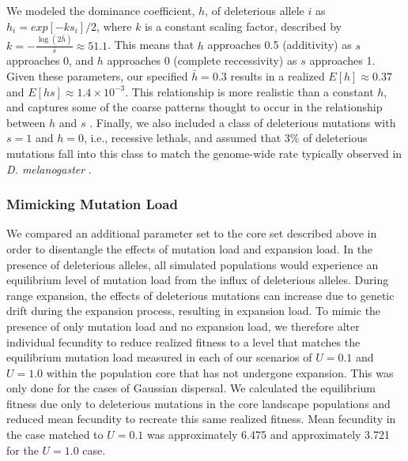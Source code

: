 We modeled the dominance coefficient, $h$, of deleterious allele $i$ as $h_i = exp[-k s_i]/2$, where $k$ is a constant scaling factor, described by $k = -\frac{\log{(2 \bar{h})}}{\bar{s}} \approx 51.1$. This means that $h$ approaches 0.5 (additivity) as $s$ approaches 0, and $h$ approaches 0 (complete reccessivity) as $s$ approaches 1. Given these parameters, our specified $\bar{h} = 0.3$ results in a realized $E[h] \approx 0.37$ and $E[hs] \approx 1.4\times10^{-3}$. This relationship is more realistic than a constant $h$, and captures some of the coarse patterns thought to occur in the relationship between $h$ and $s$ \citep{Agrawal:2011}. Finally, we also included a class of deleterious mutations with $s = 1$ and $h = 0$, i.e., recessive lethals, and assumed that 3\% of deleterious mutations fall into this class to match the genome-wide rate typically observed in \emph{D. melanogaster} \citep{Fry:1999}.


\subsubsection{Mimicking Mutation Load} %
We compared an additional parameter set to the core set described above in order to disentangle the effects of mutation load and expansion load. In the presence of deleterious alleles, all simulated populations would experience an equilibrium level of mutation load from the influx of deleterious alleles. %
During range expansion, the effects of deleterious mutations can increase due to genetic drift during the expansion process, resulting in expansion load. To mimic the presence of only mutation load and no expansion load, we therefore alter individual fecundity to reduce realized fitness to a level that matches the equilibrium mutation load measured in each of our scenarios of $U = 0.1$ and $U = 1.0$ within the population core that has not undergone expansion. This was only done for the cases of Gaussian dispersal. We calculated the equilibrium fitness due only to deleterious mutations in the core landscape populations and reduced mean fecundity to recreate this same realized fitness. Mean fecundity in the case matched to $U = 0.1$ was approximately 6.475 %
and approximately 3.721 %
for the $U = 1.0$ case.



